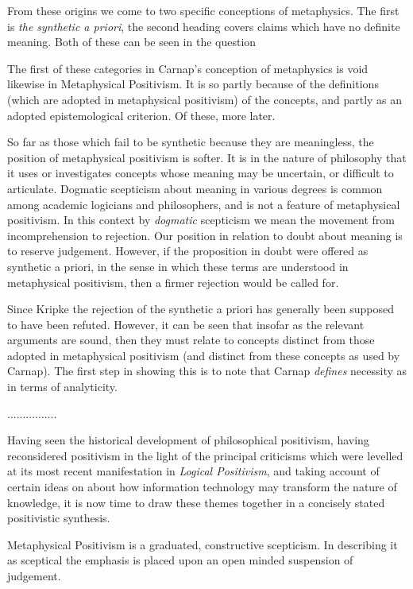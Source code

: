 From these origins we come to two specific conceptions of metaphysics.
The first is \emph{the synthetic a priori}, the second heading covers
claims which have no definite meaning.
Both of these can be seen in the question 

The first of these categories in Carnap's conception of metaphysics is
void likewise in Metaphysical Positivism.
It is so partly because of the definitions (which are adopted in
metaphysical positivism) of the concepts, and partly as an adopted
epistemological criterion.
Of these, more later.

So far as those which fail to be synthetic because they are
meaningless, the position of metaphysical positivism is softer.
It is in the nature of philosophy that it uses or investigates
concepts whose meaning may be uncertain, or difficult to articulate.
Dogmatic scepticism about meaning in various degrees is common among
academic logicians and philosophers, and is not a feature of
metaphysical positivism.
In this context by \emph{dogmatic} scepticism we mean the movement
from incomprehension to rejection.
Our position in relation to doubt about meaning is to reserve
judgement.
However, if the proposition in doubt were offered as synthetic a
  priori, in the sense in which these terms are understood in
  metaphysical positivism, then a firmer rejection would be called for. 

Since Kripke the rejection of the synthetic a priori has generally
been supposed to have been refuted.
However, it can be seen that insofar as the relevant arguments are
sound, then they must relate to concepts distinct from those adopted
in metaphysical positivism (and distinct from these concepts as used
by Carnap).
The first step in showing this is to note that Carnap \emph{defines}
necessity as in terms of analyticity.

................


Having seen the historical development of philosophical positivism,
having reconsidered positivism in the light of the principal
criticisms which were levelled at its most recent manifestation in
\emph{Logical Positivism}, and taking account of certain ideas on
about how information technology may transform the nature of
knowledge, it is now time to draw these themes together in a concisely
stated positivistic synthesis.

Metaphysical Positivism is a graduated, constructive scepticism.
In describing it as sceptical the emphasis is placed upon an open
minded suspension of judgement.

